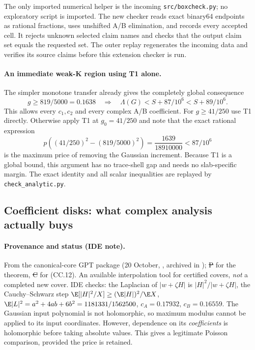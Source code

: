 The only imported numerical helper is the incoming
\texttt{src/boxcheck.py}; no exploratory script is imported.
The new checker reads exact binary64 endpoints as rational fractions,
uses unshifted A/B elimination, and records every accepted cell.
It rejects unknown selected claim names and checks that the output
claim set equals the requested set. The outer replay regenerates the
incoming data and verifies its source claims before this extension
checker is run.

\paragraph{An immediate weak-K region using T1 alone.}
The simpler monotone transfer already gives the completely global
consequence
\[
 \boxed{\quad g\ge819/5000=0.1638
 \quad\Longrightarrow\quad
 \Lambda(G)<S+87/10^6<S+89/10^6.\quad}                         \tag{WK}
\]
This allows every \(c_1,c_2\) and every complex A/B coefficient.
For \(g\ge41/250\) use T1 directly. Otherwise apply T1 at
\(g_0=41/250\) and note that the exact rational expression
\[
 p\left((41/250)^2-(819/5000)^2\right)
 =\frac{1639}{18910000}<87/10^6
\]
is the maximum price of removing the Gaussian increment. Because T1
is a global bound, this argument has no trace-shell gap and needs no
slab-specific margin. The exact identity and all scalar inequalities
are replayed by \texttt{check\_analytic.py}.

\subsection{Coefficient disks: what complex analysis actually buys}
\label{sec:cc-poisson}
\paragraph{Provenance and status (IDE note).} From the canonical-core GPT package (20 October,
, archived in ); \st{P} for the theorem, \st{C} for (CC.12).
An available interpolation tool for certified covers, \emph{not} a completed new cover. IDE checks: the Laplacian of $|w+\zeta H|$ is $|H|^2/|w+\zeta H|$,
the Cauchy--Schwarz step $\E[|H|^2/X]\ge(\E|H|)^2/\E X$, $\E|L|^2=a^2+4ab+6b^2=1181331/1562500$, $c_A=0.17932$, $c_B=0.16559$.
The Gaussian input polynomial is not holomorphic, so maximum modulus
cannot be applied to its input coordinates. However, dependence on its
\emph{coefficients} is holomorphic before taking absolute values.
This gives a legitimate Poisson comparison, provided the price is retained.


